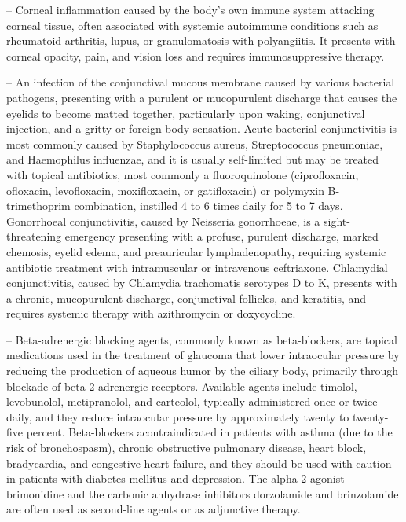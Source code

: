 -- Corneal inflammation caused by the body's own immune system attacking corneal tissue, often associated with systemic autoimmune conditions such as rheumatoid arthritis, lupus, or granulomatosis with polyangiitis. It presents with corneal opacity, pain, and vision loss and requires immunosuppressive therapy.

-- An infection of the conjunctival mucous membrane caused by various bacterial pathogens, presenting with a purulent or mucopurulent discharge that causes the eyelids to become matted together, particularly upon waking, conjunctival injection, and a gritty or foreign body sensation. Acute bacterial conjunctivitis is most commonly caused by Staphylococcus aureus, Streptococcus pneumoniae, and Haemophilus influenzae, and it is usually self-limited but may be treated with topical antibiotics, most commonly a fluoroquinolone (ciprofloxacin, ofloxacin, levofloxacin, moxifloxacin, or gatifloxacin) or polymyxin B-trimethoprim combination, instilled 4 to 6 times daily for 5 to 7 days. Gonorrhoeal conjunctivitis, caused by Neisseria gonorrhoeae, is a sight-threatening emergency presenting with a profuse, purulent discharge, marked chemosis, eyelid edema, and preauricular lymphadenopathy, requiring systemic antibiotic treatment with intramuscular or intravenous ceftriaxone. Chlamydial conjunctivitis, caused by Chlamydia trachomatis serotypes D to K, presents with a chronic, mucopurulent discharge, conjunctival follicles, and keratitis, and requires systemic therapy with azithromycin or doxycycline.

-- Beta-adrenergic blocking agents, commonly known as beta-blockers, are topical medications used in the treatment of glaucoma that lower intraocular pressure by reducing the production of aqueous humor by the ciliary body, primarily through blockade of beta-2 adrenergic receptors. Available agents include timolol, levobunolol, metipranolol, and carteolol, typically administered once or twice daily, and they reduce intraocular pressure by approximately twenty to twenty-five percent. Beta-blockers acontraindicated in patients with asthma (due to the risk of bronchospasm), chronic obstructive pulmonary disease, heart block, bradycardia, and congestive heart failure, and they should be used with caution in patients with diabetes mellitus and depression. The alpha-2 agonist brimonidine and the carbonic anhydrase inhibitors dorzolamide and brinzolamide are often used as second-line agents or as adjunctive therapy.

